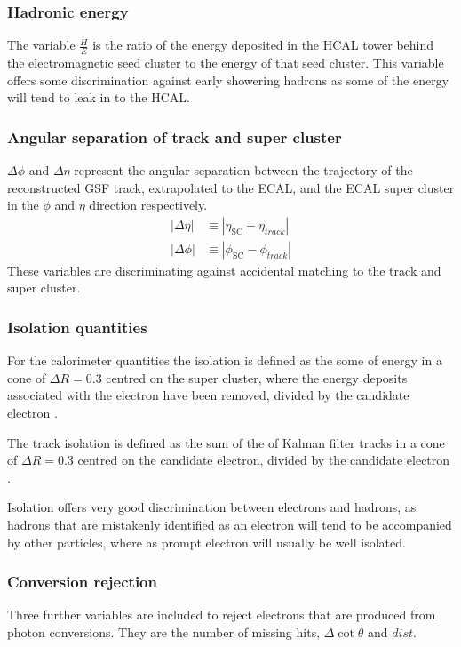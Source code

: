 \subsubsection{Hadronic energy}
The variable $\frac{H}{E}$ is the ratio of the energy deposited in the HCAL
tower behind the electromagnetic seed cluster to the energy of that seed
cluster. This variable offers some discrimination against early showering
hadrons as some of the energy will tend to leak in to the HCAL.

\subsubsection{Angular separation of track and super cluster}
$\Delta\phi$ and $\Delta\eta$ represent the angular separation between the
trajectory of the reconstructed GSF track, extrapolated to the ECAL, and the ECAL super cluster in the $\phi$
and $\eta$ direction respectively.
\begin{align}
|\Delta\eta| &\equiv |\eta_{\text{SC}} - \eta_{track}|\\
|\Delta\phi| &\equiv |\phi_{\text{SC}} - \phi_{track}|
\end{align}
These variables are discriminating against accidental matching to the track and
super cluster.

\subsubsection{Isolation quantities}
For the calorimeter quantities the isolation is defined as the some of energy in
a cone of $\Delta R = 0.3 $ centred on the super cluster, where the energy
deposits associated with the electron have been removed, divided by the
candidate electron \Pt.

The track isolation is defined as the sum of the \Pt of Kalman filter tracks in
a cone of $\Delta R = 0.3 $ centred on the candidate electron, divided by the
candidate electron \Pt.

Isolation offers very good discrimination between electrons and hadrons, as
hadrons that are mistakenly identified as an electron will tend to be
accompanied by other particles, where as prompt electron will usually be well
isolated.

\subsubsection{Conversion rejection}
Three further variables are included to reject electrons that are produced from
photon conversions. They are the number of missing hits, $\Delta\cot\theta$ and
$dist$. 

